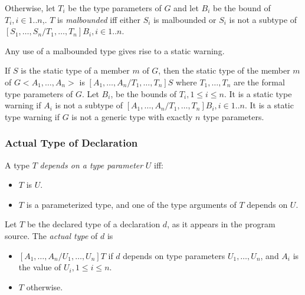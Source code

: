 \documentclass{article}
\begin{document}

\LMHash{}
Otherwise, let
 $T_i$ be the type parameters of $G$ and let $B_i$ be the bound of $T_i,  i \in 1.. n$,. $T$ is {\em malbounded} iff either $S_i$ is malbounded  or $S_i$ is not a subtype of $[S_1,  \ldots, S_n/T_1, \ldots, T_n]B_i,   i \in 1.. n$.


\LMHash{}
Any use of a malbounded type gives rise to a static warning.

\LMHash{}
If $S$ is the static type of a member $m$ of $G$, then the static type of the member $m$ of  $G<A_1, \ldots, A_n>$  is $[A_1,  \ldots, A_n/T_1,  \ldots, T_n]S$ where $T_1,  \ldots, T_n$ are the formal type parameters of $G$.   Let $B_i$, be the bounds of $T_i, 1 \le i \le n$. It is a static type warning if $A_i$ is not a subtype of  $[A_1,  \ldots, A_n/T_1,  \ldots, T_n]B_i, i \in 1..n$. It is a static type warning if $G$ is not a generic type with exactly $n$ type parameters.





\subsubsection{Actual Type of Declaration}

\LMHash{}
A type $T$ {\em depends on a type parameter} $U$ iff:
\begin{itemize}
\item $T$ is $U$.
\item $T$ is a parameterized type, and one of the type arguments of $T$ depends on $U$.
\end{itemize}

\LMHash{}
Let $T$ be the declared type of a declaration $d$, as it appears in the program source. The {\em actual type} of $d$ is

\begin{itemize}
\item  $[A_1, \ldots, A_n/U_1, \ldots, U_n]T$ if $d$ depends on type parameters $U_1, \ldots, U_n$, and $A_i$ is the value of $U_i, 1 \le i \le n$.
\item $T$ otherwise.
\end{itemize}
\end{document}
